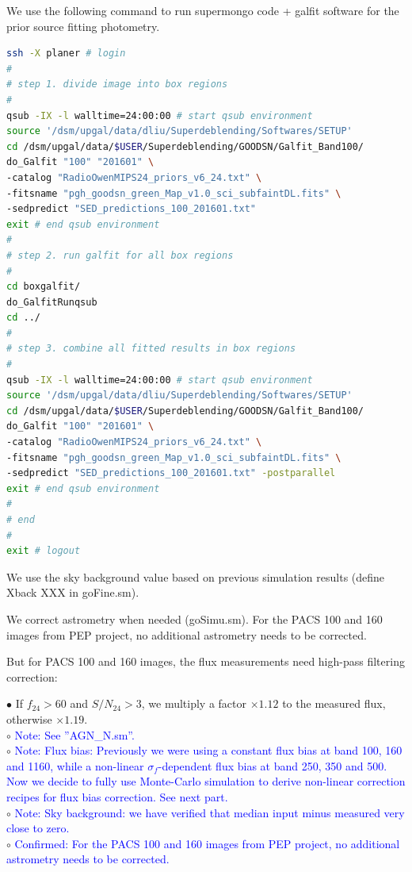 \documentclass[11pt,a4paper]{article}
\begin{document}
We use the following command to run supermongo code + galfit software for the prior source fitting photometry. 

\begin{lstlisting}[language=bash]
ssh -X planer # login
# 
# step 1. divide image into box regions
# 
qsub -IX -l walltime=24:00:00 # start qsub environment
source '/dsm/upgal/data/dliu/Superdeblending/Softwares/SETUP'
cd /dsm/upgal/data/$USER/Superdeblending/GOODSN/Galfit_Band100/
do_Galfit "100" "201601" \
-catalog "RadioOwenMIPS24_priors_v6_24.txt" \
-fitsname "pgh_goodsn_green_Map_v1.0_sci_subfaintDL.fits" \
-sedpredict "SED_predictions_100_201601.txt"
exit # end qsub environment
# 
# step 2. run galfit for all box regions
# 
cd boxgalfit/
do_GalfitRunqsub
cd ../
# 
# step 3. combine all fitted results in box regions
# 
qsub -IX -l walltime=24:00:00 # start qsub environment
source '/dsm/upgal/data/dliu/Superdeblending/Softwares/SETUP'
cd /dsm/upgal/data/$USER/Superdeblending/GOODSN/Galfit_Band100/
do_Galfit "100" "201601" \
-catalog "RadioOwenMIPS24_priors_v6_24.txt" \
-fitsname "pgh_goodsn_green_Map_v1.0_sci_subfaintDL.fits" \
-sedpredict "SED_predictions_100_201601.txt" -postparallel
exit # end qsub environment
# 
# end
# 
exit # logout
\end{lstlisting}

We use the sky background value based on previous simulation results (define Xback XXX in goFine.sm). 

We correct astrometry when needed (goSimu.sm). For the PACS 100 and 160 images from PEP project, no additional astrometry needs to be corrected. 

But for PACS 100 and 160 images, the flux measurements need high-pass filtering correction: 

\indent\hspace{15pt}$\bullet$ 
If $f_{24}>60$ and $S/N_{24}>3$, we multiply a factor $\times 1.12$ to the measured flux, otherwise $\times 1.19$. 
\\
\indent\hspace{15pt}$\circ$ 
\textcolor{blue}{Note: See ''AGN\_N.sm''.}
\\
\indent\hspace{15pt}$\circ$ 
\textcolor{blue}{Note: Flux bias: Previously we were using a constant flux bias at band 100, 160 and 1160, while a non-linear $\sigma_{f}$-dependent flux bias at band 250, 350 and 500. Now we decide to fully use Monte-Carlo simulation to derive non-linear correction recipes for flux bias correction. See next part. }
\\
\indent\hspace{15pt}$\circ$ 
\textcolor{blue}{Note: Sky background: we have verified that median input minus measured very close to zero.}
\\
\indent\hspace{15pt}$\circ$ 
\textcolor{blue}{Confirmed: For the PACS 100 and 160 images from PEP project, no additional astrometry needs to be corrected.}
\\
\end{document}
